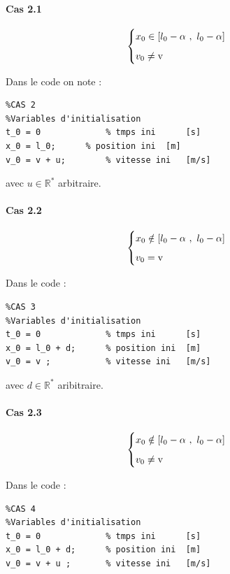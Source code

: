 \documentclass{article}
\begin{document}
\paragraph{Cas 2.1}
 
$$
\begin{cases}
	\vspace{.2cm}
	x_0 \in [l_0-\alpha~,~l_0-\alpha]\\
	v_0\neq \text{v}
\end{cases}
$$

Dans le code on note :

\begin{lstlisting}
%CAS 2
%Variables d'initialisation
t_0 = 0 			% tmps ini		[s]
x_0 = l_0; 		% position ini	[m]
v_0 = v + u;		% vitesse ini	[m/s]     
\end{lstlisting}

avec $u\in \mathbb{R}^*$ arbitraire.

\paragraph{Cas 2.2}

$$
\begin{cases}
	\vspace{.2cm}
	x_0 \notin [l_0-\alpha~,~l_0-\alpha]\\
	v_0= \text{v}
\end{cases}
$$

Dans le code :

\begin{lstlisting}
%CAS 3
%Variables d'initialisation
t_0 = 0				% tmps ini		[s]
x_0 = l_0 + d;		% position ini	[m]
v_0 = v ;			% vitesse ini	[m/s]       
\end{lstlisting}

avec $d\in \mathbb{R}^*$ aribitraire.

\paragraph{Cas 2.3}

$$
\begin{cases}
	\vspace{.2cm}
	x_0 \notin [l_0-\alpha~,~l_0-\alpha]\\
	v_0\neq \text{v}
\end{cases}
$$

Dans le code :

\begin{lstlisting}
%CAS 4
%Variables d'initialisation
t_0 = 0				% tmps ini		[s]
x_0 = l_0 + d;		% position ini	[m]
v_0 = v + u ;		% vitesse ini	[m/s]       
\end{lstlisting}
\end{document}
